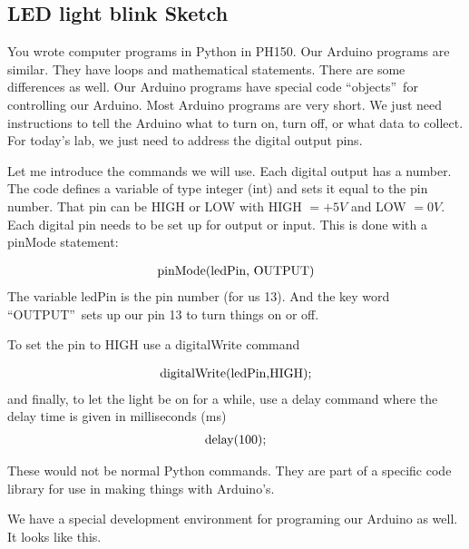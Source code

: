 \subsection{LED light blink Sketch}

You wrote computer programs in Python in PH150. Our Arduino programs are
similar. They have loops and mathematical statements. There are some
differences as well. Our Arduino programs have special code
\textquotedblleft objects\textquotedblright\ for controlling our Arduino.
Most Arduino programs are very short. We just need instructions to tell the
Arduino what to turn on, turn off, or what data to collect. For today's lab,
we just need to address the digital output pins.

Let me introduce the commands we will use. Each digital output has a number.
The code defines a variable of type integer (int) and sets it equal to the
pin number. That pin can be HIGH or LOW with HIGH $=+5\unit{V}$ and LOW $=0%
\unit{V}$. Each digital pin needs to be set up for output or input. This is
done with a pinMode statement:

\begin{equation*}
	\begin{tabular}{l}
		pinMode(ledPin, OUTPUT)
	\end{tabular}
\end{equation*}
The variable ledPin is the pin number (for us 13). And the key word
\textquotedblleft OUTPUT\textquotedblright\ sets up our pin 13 to turn
things on or off.

To set the pin to HIGH use a digitalWrite command

\begin{equation*}
	\begin{tabular}{l}
		digitalWrite(ledPin,HIGH);
	\end{tabular}
\end{equation*}
and finally, to let the light be on for a while, use a delay command where
the delay time is given in milliseconds (ms)%
\begin{equation*}
	\begin{tabular}{l}
		delay(100);
	\end{tabular}
\end{equation*}

These would not be normal Python commands. They are part of a specific code
library for use in making things with Arduino's.

We have a special development environment for programing our Arduino as
well. It looks like this. 


